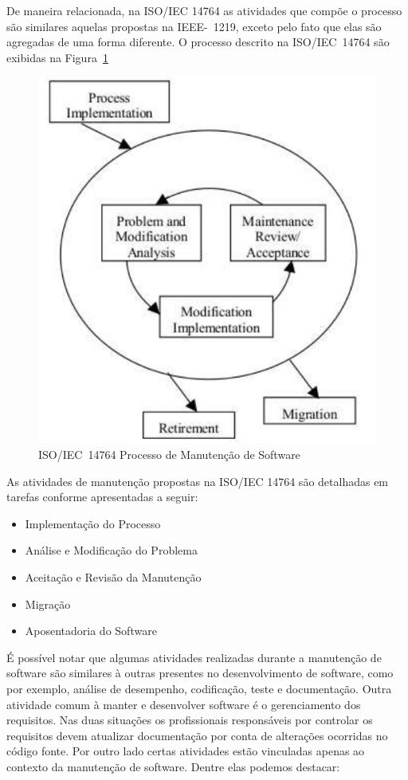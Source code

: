 De maneira relacionada, na ISO/IEC 14764 as atividades que compõe o processo são
similares aquelas propostas na IEEE-~1219, exceto pelo fato que elas são
agregadas de uma forma diferente. O processo descrito na ISO/IEC~14764 são
exibidas na Figura~\ref{fig:ieee-14764-processo-manutencao}

\begin{figure}[htpb] \centering
	\includegraphics[width=0.7\linewidth]
{chapter-manutencao-software-visao-geral/img/ieee-14764-processo-manutencao.pdf}
	\caption{ISO/IEC~14764 Processo de Manutenção de Software}
\label{fig:ieee-14764-processo-manutencao} \end{figure}

As atividades de manutenção propostas na ISO/IEC 14764 são detalhadas em tarefas
conforme apresentadas a seguir:

\begin{itemize}
   	\item Implementação do Processo
   	\item Análise e Modificação do
		Problema 
	\item Aceitação e Revisão da Manutenção
   	\item Migração
   	\item Aposentadoria do Software
\end{itemize}

É possível notar que algumas atividades realizadas durante a manutenção de
software são similares à outras presentes no desenvolvimento de software, como
por exemplo, análise de desempenho, codificação, teste e documentação. Outra
atividade comum à manter e desenvolver software é o gerenciamento dos
requisitos. Nas duas situações os profissionais responsáveis por controlar os
requisitos devem atualizar do\-cu\-men\-ta\-ção  por conta de alterações
ocorridas no código fonte. Por outro lado certas atividades estão vinculadas
apenas ao contexto da manutenção de software. Dentre elas podemos destacar:

